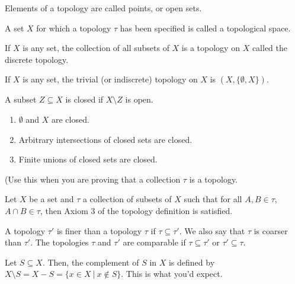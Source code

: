 \documentclass{article}
\begin{document}
\medskip{}

	Elements of a topology are called points, or open sets.

\medskip{}

    A set $X$ for which a topology $\tau$ has been specified is called a topological space.

\medskip{}

    If $X$ is any set, the collection of all subsets of $X$ is a topology on $X$ called the discrete topology.

\medskip{}

    If $X$ is any set, the trivial (or indiscrete) topology on $X$ is $(X, \{\emptyset, X\})$.

\medskip{}

	A subset $Z \subseteq X$ is closed if $X \setminus Z$ is open.

\medskip{}

	\begin{enumerate}
		\item $\emptyset$ and $X$ are closed.
		\item Arbitrary intersections of closed sets are closed.
		\item Finite unions of closed sets are closed.
	\end{enumerate}

\medskip{}

	(Use this when you are proving that a collection $\tau$ is a topology.
	
	Let $X$ be a set and $\tau$ a collection of subsets of $X$ such that for all $A,B \in \tau$, $A \cap B \in \tau$, then Axiom 3 of the topology definition is satisfied.

\medskip{}

	A topology $\tau'$ is finer than a topology $\tau$ if $\tau \subseteq \tau'$. We also say that $\tau$ is coarser than $\tau'$. The topologies $\tau$ and $\tau'$ are comparable if $\tau \subseteq \tau'$ or $\tau' \subseteq \tau$.

\medskip{}

    Let $S \subseteq X$. Then, the complement of $S$ in $X$ is defined by $X \setminus S = X - S = \{x \in X~|~x \notin S\}$. This is what you'd expect.

\medskip{}
\end{document}
